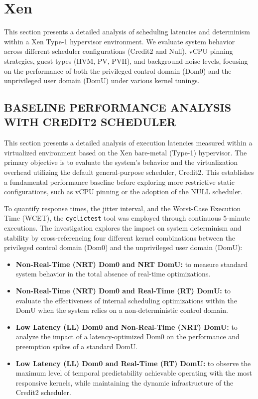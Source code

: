\section{Xen}
\label{sec:xen}

This section presents a detailed analysis of scheduling latencies and
determinism within a Xen Type-1 hypervisor environment.
We evaluate system behavior across different scheduler configurations
(Credit2 and Null), vCPU pinning strategies, guest types (HVM, PV, PVH),
and background-noise levels, focusing on the performance of both the
privileged control domain (Dom0) and the unprivileged user domain (DomU)
under various kernel tunings.

\subsection{BASELINE PERFORMANCE ANALYSIS WITH CREDIT2
SCHEDULER}\label{baseline-performance-analysis-with-credit2-scheduler}

This section presents a detailed analysis of execution latencies
measured within a virtualized environment based on the Xen bare-metal
(Type-1) hypervisor. The primary objective is to evaluate the system's
behavior and the virtualization overhead utilizing the default
general-purpose scheduler, Credit2. This establishes a fundamental
performance baseline before exploring more restrictive static
configurations, such as vCPU pinning or the adoption of the NULL
scheduler.

To quantify response times, the jitter interval, and the Worst-Case
Execution Time (WCET), the \texttt{cyclictest} tool was employed through
continuous 5-minute executions. The investigation explores the impact on
system determinism and stability by cross-referencing four different
kernel combinations between the privileged control domain (Dom0) and the
unprivileged user domain (DomU):

\begin{itemize}
\item
  \textbf{Non-Real-Time (NRT) Dom0 and NRT DomU:} to measure standard
  system behavior in the total absence of real-time optimizations.
\item
  \textbf{Non-Real-Time (NRT) Dom0 and Real-Time (RT) DomU:} to evaluate
  the effectiveness of internal scheduling optimizations within the DomU
  when the system relies on a non-deterministic control domain.
\item
  \textbf{Low Latency (LL) Dom0 and Non-Real-Time (NRT) DomU:} to
  analyze the impact of a latency-optimized Dom0 on the performance and
  preemption spikes of a standard DomU.
\item
  \textbf{Low Latency (LL) Dom0 and Real-Time (RT) DomU:} to observe the
  maximum level of temporal predictability achievable operating with the
  most responsive kernels, while maintaining the dynamic infrastructure
  of the Credit2 scheduler.
\end{itemize}

